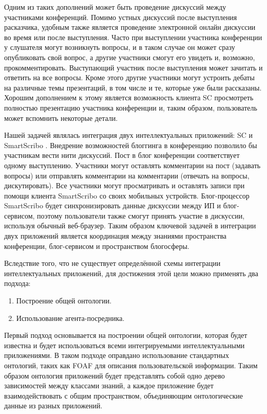 Одним из таких дополнений может быть проведение дискуссий между участниками конференций. Помимо устных дискуссий после выступления расказчика, удобным также является проведение электронной онлайн дискуссии во время или после выступления. Часто при выступлении участника конференции у слушателя могут возникнуть вопросы, и в таком случае он может сразу опубликовать свой вопрос, а другие участники смогут его увидеть и, возможно, прокомментировать. Выступающий участник после выступления может зачитать и ответить на все вопросы. Кроме этого другие участники могут устроить дебаты на различные темы презентаций, в том числе и те, которые уже были рассказаны. Хорошим дополнением к этому является возможность клиента SC просмотреть полностью презентацию участника конференции и, таким образом, пользователь может вспомнить некоторые детали.

Нашей задачей являлась интеграция двух интеллектуальных приложений: SC и SmartScribo \cite{scblogging}. Внедрение возможностей блоггинга в конференцию позволило бы участникам вести нити дискуссий. Пост в блог конференции соответствует одному выступлению. Участники могут оставлять комментарии на пост (задавать вопросы) или отправлять комментарии на комментарии (отвечать на вопросы, дискутировать). Все участники могут просматривать и оставлять записи при помощи клиента SmartScribo со своих мобильных устройств. Блог-процессор SmartScribo будет синхронизировать данные дискуссии между ИП и блог-сервисом, поэтому пользователи также смогут принять участие в дискуссии, используя обычный веб-браузер. Таким образом ключевой задачей в интеграции двух приложений является координация между знаниями пространства конференции, блог-сервисом и пространством блогосферы.

Вследствие того, что не существует определённой схемы интеграции интеллектуальных приложений, для достижения этой цели можно применять два подхода:
\begin{enumerate}
\item Построение общей онтологии.
\item Использование агента-посредника.
\end{enumerate}

Первый подход основывается на построении общей онтологии, которая будет известна и будет использоваться всеми интегрируемыми интеллектуальными приложениями. В таком подходе оправдано использование стандартных онтологий, таких как FOAF для описания пользовательской информации. Таким образом онтология приложений будет представлять собой одно дерево зависимостей между классами знаний, а каждое приложение будет взаимодействовать с общим пространством, объединяющим онтологические данные из разных приложений.

